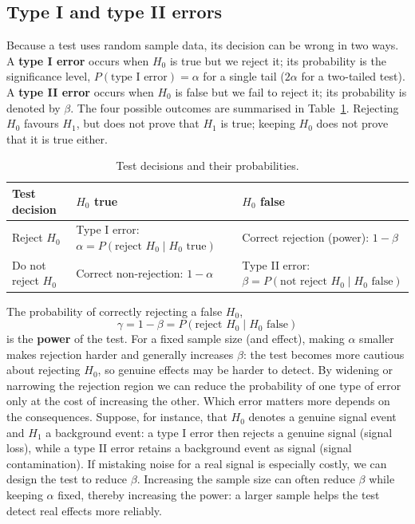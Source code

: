 \documentclass[letterpaper,11pt,leqno]{book}
\begin{document}
\subsection{Type I and type II errors}

Because a test uses random sample data, its decision can be wrong in two ways. A \textbf{type I error} occurs when $H_0$ is true but we reject it; its probability is the significance level, $P(\text{type I error}) = \alpha$ for a single tail ($2\alpha$ for a two-tailed test). A \textbf{type II error} occurs when $H_0$ is false but we fail to reject it; its probability is denoted by $\beta$. The four possible outcomes are summarised in Table~\ref{tab:test_errors}. Rejecting $H_0$ favours $H_1$, but does not prove that $H_1$ is true; keeping $H_0$ does not prove that it is true either.

\begin{table}[!htbp]
\centering
\caption{Test decisions and their probabilities.}
\label{tab:test_errors}
\begin{tabular*}{\textwidth}{l@{\extracolsep\fill}ll}
\toprule
Test decision & $H_0$ true & $H_0$ false \\
\midrule
Reject $H_0$ & Type I error: $\alpha = P(\text{reject } H_0 \mid H_0 \text{ true})$ & Correct rejection (power): $1 - \beta$ \\
Do not reject $H_0$ & Correct non-rejection: $1 - \alpha$ & Type II error: $\beta = P(\text{not reject } H_0 \mid H_0 \text{ false})$ \\
\bottomrule
\end{tabular*}
\end{table}

The probability of correctly rejecting a false $H_0$,
\begin{equation}
\boxed{\gamma = 1 - \beta = P(\text{reject } H_0 \mid H_0 \text{ false})}
\label{eq:power}
\end{equation}
is the \textbf{power} of the test. For a fixed sample size (and effect), making $\alpha$ smaller makes rejection harder and generally increases $\beta$: the test becomes more cautious about rejecting $H_0$, so genuine effects may be harder to detect. By widening or narrowing the rejection region we can reduce the probability of one type of error only at the cost of increasing the other. Which error matters more depends on the consequences. Suppose, for instance, that $H_0$ denotes a genuine signal event and $H_1$ a background event: a type I error then rejects a genuine signal (signal loss), while a type II error retains a background event as signal (signal contamination). If mistaking noise for a real signal is especially costly, we can design the test to reduce $\beta$. Increasing the sample size can often reduce $\beta$ while keeping $\alpha$ fixed, thereby increasing the power: a larger sample helps the test detect real effects more reliably.
\end{document}
